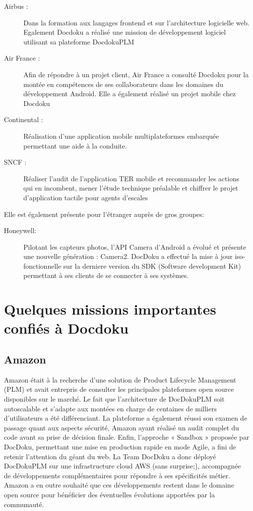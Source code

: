 \documentclass[11pt]{report}
\begin{document}
		\begin{description}
			\item[Airbus : ] Dans la formation aux langages frontend et sur l'architecture logicielle web. Egalement Docdoku a réalisé une mission de développement logiciel utilisant sa plateforme DocdokuPLM
			\item [Air France : ] Afin de répondre à un projet client, Air France a consulté Docdoku pour la montée en compétences de ses collaborateurs dans les domaines du développement Android. Elle a également réalisé un projet mobile chez Docdoku
			\item [Continental :] Réalisation d'une application mobile multiplateformes embarquée permettant une aide à la conduite.
			\item [SNCF :] Réaliser l'audit de l'application TER mobile et recommander les actions qui en incombent, mener l'étude technique préalable et chiffrer le projet d'application tactile pour agents d'escales
		\end{description}

		\singlespacing
		\noindent
		Elle est également présente pour l'étranger auprès de gros groupes: 

		\begin{description}
			\item [Honeywell: ] Pilotant les capteurs photos, l'API Camera d'Android a évolué et présente une nouvelle génération : Camera2. DocDoku a effectué la mise à jour iso-fonctionnelle sur la derniere version du SDK (Software development Kit) permettant à ses clients de se connecter à ses systèmes.
		\end{description}

		\section{Quelques missions importantes confiés à Docdoku}

			\subsection{Amazon}
				Amazon était à la recherche d'une solution de Product Lifecycle Management (PLM) et avait entrepris de consulter les principales plateformes open source disponibles sur le marché.
				\singlespacing
				Le fait que l'architecture de DocDokuPLM soit autoscalable et s'adapte aux montées en charge de centaines de milliers d'utilisateurs a été différenciant.
				La plateforme a également réussi son examen de passage quant aux aspects sécurité, Amazon ayant réalisé un audit complet du code avant sa prise de décision finale. Enfin, l'approche « Sandbox » proposée par DocDoku, permettant une mise en production rapide en mode Agile, a fini de retenir l'attention du géant du web.
				La Team DocDoku a donc déployé DocDokuPLM sur une infrastructure cloud AWS (sans surprise;), accompagnée de développements complémentaires pour répondre à ses spécificités métier.
				Amazon a en outre souhaité que ces développements restent dans le domaine open source pour bénéficier des éventuelles évolutions apportées par la communauté.
\end{document}
